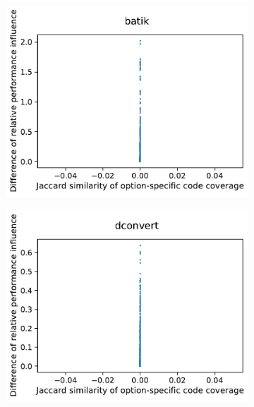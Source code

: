 \begin{figure}
	\centering
	\begin{subfigure}{0.33\textwidth}
		\centering
		\includegraphics[width=\linewidth]{images/rq3.2/batik_rq3.2.pdf}
		\caption{\batik}
	\end{subfigure}
	\begin{subfigure}{0.33\textwidth}
		\centering
		\includegraphics[width=\linewidth]{images/rq3.2/dconvert_rq3.2.pdf}
		\caption{\dconvert}
	\end{subfigure}
	\begin{subfigure}{0.33\textwidth}
		\centering

\end{subfigure}
\end{figure}
